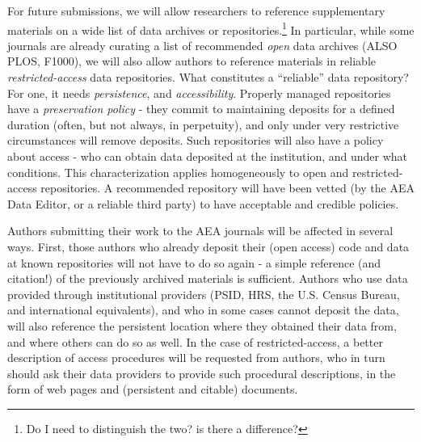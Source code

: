 \documentclass[AEJ]{AEA}
\begin{document}
For future submissions, we will allow researchers to reference supplementary materials on a wide list of data archives or repositories.\footnote{Do I need to distinguish the two? is there a difference?} 
In particular, while some journals are already curating a list of recommended \textit{open} data archives \citep{Nature_Scientific_Data2016-hl} (ALSO PLOS, F1000), we will also allow authors to reference materials in reliable \textit{restricted-access} data repositories. What constitutes a ``reliable'' data repository? For one, it needs \textit{persistence}, and \textit{accessibility}. Properly managed repositories have a \textit{preservation policy} - they commit to maintaining deposits for a defined duration (often, but not always, in perpetuity), and only under very restrictive circumstances will remove deposits. Such repositories will also have a policy about access - who can obtain data deposited at the institution, and under what conditions. This characterization applies homogeneously to open and restricted-access repositories. A recommended repository will have been vetted (by the AEA Data Editor, or a reliable third party) to have acceptable and credible policies. 

Authors submitting their work to the AEA journals will be affected in several ways. First, those authors who already deposit their (open access) code and data at known repositories will not have to do so again - a simple reference (and citation!) of the previously archived materials is sufficient. Authors who use data provided through institutional providers (\ac{PSID}, \ac{HRS}, the U.S. Census Bureau, and international equivalents), and who in some cases cannot deposit the data, will also reference the persistent location where they obtained their data from, and where others can do so as well. In the case of restricted-access, a better description of access procedures will be requested from authors, who in turn should ask their data providers to provide such procedural descriptions, in the form of web pages and (persistent and citable) documents. 
\end{document}
